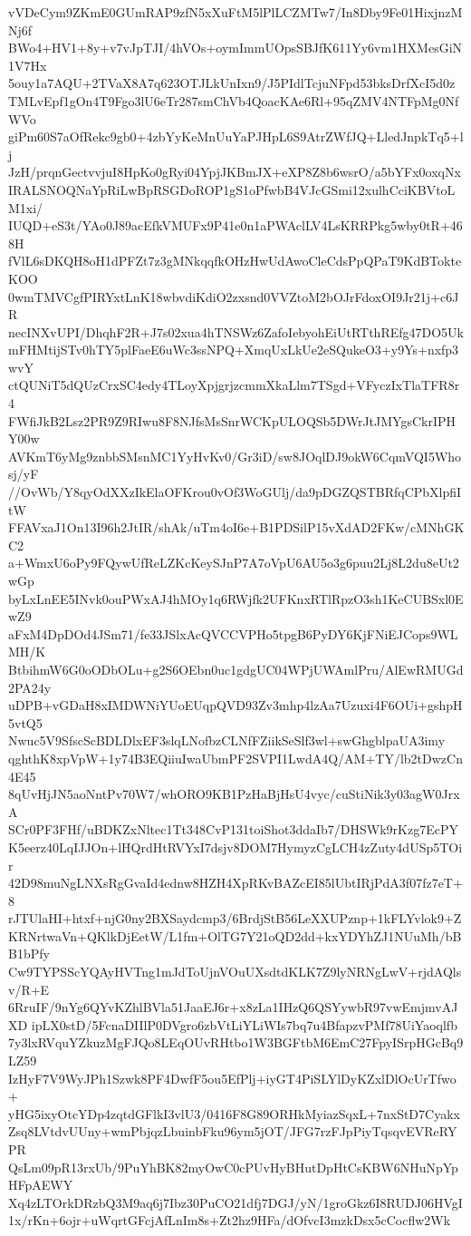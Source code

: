 vVDeCym9ZKmE0GUmRAP9zfN5xXuFtM5lPlLCZMTw7/In8Dby9Fe01HixjnzMNj6f
BWo4+HV1+8y+v7vJpTJI/4hVOs+oymImmUOpsSBJfK611Yy6vm1HXMesGiN1V7Hx
5ouy1a7AQU+2TVaX8A7q623OTJLkUnIxn9/J5PIdlTcjuNFpd53bksDrfXcI5d0z
TMLvEpf1gOn4T9Fgo3lU6eTr287smChVb4QoacKAe6Rl+95qZMV4NTFpMg0NfWVo
giPm60S7aOfRekc9gb0+4zbYyKeMnUuYaPJHpL6S9AtrZWfJQ+LledJnpkTq5+lj
JzH/prqnGectvvjuI8HpKo0gRyi04YpjJKBmJX+eXP8Z8b6wsrO/a5bYFx0oxqNx
IRALSNOQNaYpRiLwBpRSGDoROP1gS1oPfwbB4VJcGSmi12xulhCciKBVtoLM1xi/
IUQD+eS3t/YAo0J89acEfkVMUFx9P41e0n1aPWAclLV4LsKRRPkg5wby0tR+468H
fVlL6sDKQH8oH1dPFZt7z3gMNkqqfkOHzHwUdAwoCleCdsPpQPaT9KdBTokteKOO
0wmTMVCgfPIRYxtLnK18wbvdiKdiO2zxsnd0VVZtoM2bOJrFdoxOI9Jr21j+c6JR
necINXvUPI/DhqhF2R+J7s02xua4hTNSWz6ZafoIebyohEiUtRTthREfg47DO5Uk
mFHMtijSTv0hTY5plFaeE6uWc3ssNPQ+XmqUxLkUe2eSQukeO3+y9Ys+nxfp3wvY
ctQUNiT5dQUzCrxSC4edy4TLoyXpjgrjzcmmXkaLlm7TSgd+VFyczIxTlaTFR8r4
FWfiJkB2Lsz2PR9Z9RIwu8F8NJfsMsSnrWCKpULOQSb5DWrJtJMYgsCkrIPHY00w
AVKmT6yMg9znbbSMsnMC1YyHvKv0/Gr3iD/sw8JOqlDJ9okW6CqmVQI5Whosj/yF
//OvWb/Y8qyOdXXzIkElaOFKrou0vOf3WoGUlj/da9pDGZQSTBRfqCPbXlpfiItW
FFAVxaJ1On13I96h2JtIR/shAk/uTm4oI6e+B1PDSilP15vXdAD2FKw/cMNhGKC2
a+WmxU6oPy9FQywUfReLZKcKeySJnP7A7oVpU6AU5o3g6puu2Lj8L2du8eUt2wGp
byLxLnEE5INvk0ouPWxAJ4hMOy1q6RWjfk2UFKnxRTlRpzO3sh1KeCUBSxl0EwZ9
aFxM4DpDOd4JSm71/fe33JSlxAcQVCCVPHo5tpgB6PyDY6KjFNiEJCops9WLMH/K
BtbihmW6G0oODbOLu+g2S6OEbn0uc1gdgUC04WPjUWAmlPru/AlEwRMUGd2PA24y
uDPB+vGDaH8xIMDWNiYUoEUqpQVD93Zv3mhp4lzAa7Uzuxi4F6OUi+gshpH5vtQ5
Nwuc5V9SfscScBDLDlxEF3slqLNofbzCLNfFZiikSeSlf3wl+swGhgblpaUA3imy
qghthK8xpVpW+1y74B3EQiiuIwaUbmPF2SVPI1LwdA4Q/AM+TY/lb2tDwzCn4E45
8qUvHjJN5aoNntPv70W7/whORO9KB1PzHaBjHsU4vyc/cuStiNik3y03agW0JrxA
SCr0PF3FHf/uBDKZxNltec1Tt348CvP131toiShot3ddaIb7/DHSWk9rKzg7EcPY
K5eerz40LqIJJOn+lHQrdHtRVYxI7dsjv8DOM7HymyzCgLCH4zZuty4dUSp5TOir
42D98muNgLNXsRgGvaId4ednw8HZH4XpRKvBAZcEI85lUbtIRjPdA3f07fz7eT+8
rJTUlaHI+htxf+njG0ny2BXSaydcmp3/6BrdjStB56LeXXUPznp+1kFLYvlok9+Z
KRNrtwaVn+QKlkDjEetW/L1fm+OlTG7Y21oQD2dd+kxYDYhZJ1NUuMh/bBB1bPfy
Cw9TYPSScYQAyHVTng1mJdToUjnVOuUXsdtdKLK7Z9lyNRNgLwV+rjdAQlsv/R+E
6RruIF/9nYg6QYvKZhlBVla51JaaEJ6r+x8zLa1IHzQ6QSYywbR97vwEmjmvAJXD
ipLX0stD/5FcnaDIIlP0DVgro6zbVtLiYLiWIs7bq7u4BfapzvPMf78UiYaoqlfb
7y3lxRVquYZkuzMgFJQo8LEqOUvRHtbo1W3BGFtbM6EmC27FpyISrpHGcBq9LZ59
IzHyF7V9WyJPh1Szwk8PF4DwfF5ou5EfPlj+iyGT4PiSLYlDyKZxlDlOcUrTfwo+
yHG5ixyOtcYDp4zqtdGFlkI3vlU3/0416F8G89ORHkMyiazSqxL+7nxStD7Cyakx
Zsq8LVtdvUUny+wmPbjqzLbuinbFku96ym5jOT/JFG7rzFJpPiyTqsqvEVReRYPR
QsLm09pR13rxUb/9PuYhBK82myOwC0cPUvHyBHutDpHtCsKBW6NHuNpYpHFpAEWY
Xq4zLTOrkDRzbQ3M9aq6j7Ibz30PuCO21dfj7DGJ/yN/1groGkz6I8RUDJ06HVgI
1x/rKn+6ojr+uWqrtGFcjAfLnIm8s+Zt2hz9HFa/dOfvcI3mzkDsx5cCocflw2Wk
